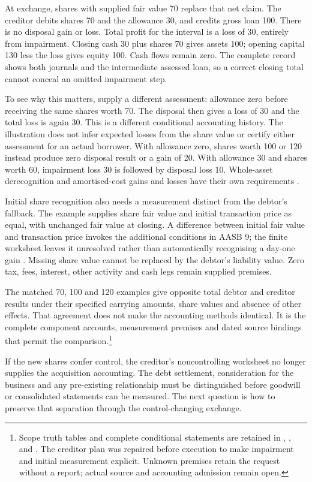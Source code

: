 At exchange, shares with supplied fair value 70 replace that net claim.
The creditor debits shares 70 and the allowance 30, and credits gross loan 100.
There is no disposal gain or loss. Total profit for the interval is a loss of
30, entirely from impairment. Closing cash 30 plus shares 70 gives assets 100;
opening capital 130 less the loss gives equity 100. Cash flows remain zero.
The complete record shows both journals and the intermediate assessed loan,
so a correct closing total cannot conceal an omitted impairment step.

To see why this matters, supply a different assessment: allowance zero before
receiving the same shares worth 70. The disposal then gives a loss of 30 and
the total loss is again 30. This is a different conditional accounting history.
The illustration does not infer expected losses from the share value or certify
either assessment for an actual borrower. With allowance zero, shares worth
100 or 120 instead produce zero disposal result or a gain of 20. With allowance
30 and shares worth 60, impairment loss 30 is followed by disposal loss 10.
Whole-asset derecognition and amortised-cost gains and losses have their own
requirements \citep[paras.~3.2.12, 5.7.2]{aasb9scope2026}.

Initial share recognition also needs a measurement distinct from the debtor's
fallback. The example supplies share fair value and initial transaction price
as equal, with unchanged fair value at closing. A difference between initial
fair value and transaction price invokes the additional conditions in
AASB 9; the finite worksheet leaves it unresolved rather than automatically
recognising a day-one gain \citep[paras.~5.1.1--5.1.1A, B5.1.2A]{aasb9scope2026}.
Missing share value cannot be replaced by the debtor's liability value.
Zero tax, fees, interest, other activity and cash legs remain supplied premises.

The matched 70, 100 and 120 examples give opposite total debtor and creditor
results under their specified carrying amounts, share values and absence of
other effects. That agreement does not make the accounting methods identical.
It is the complete component accounts, measurement premises and dated source
bindings that permit the comparison.\footnote{Scope truth tables and complete
conditional statements are retained in
,
, and
.
The creditor plan was repaired before execution to make impairment and initial
measurement explicit. Unknown premises retain the request without a report;
actual source and accounting admission remain open.}

If the new shares confer control, the creditor's noncontrolling worksheet no
longer supplies the acquisition accounting. The debt settlement, consideration
for the business and any pre-existing relationship must be distinguished before
goodwill or consolidated statements can be measured. The next question is how
to preserve that separation through the control-changing exchange.
